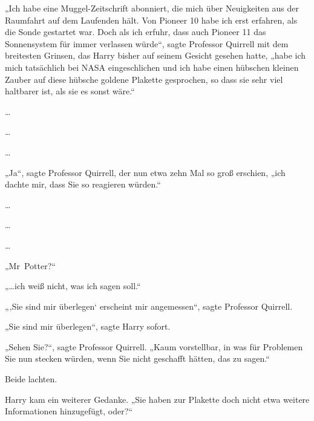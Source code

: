 „Ich habe eine Muggel-Zeitschrift abonniert, die mich über Neuigkeiten aus der Raumfahrt auf dem Laufenden hält. Von Pioneer 10 habe ich erst erfahren, als die Sonde gestartet war. Doch als ich erfuhr, dass auch Pioneer 11 das Sonnensystem für immer verlassen würde“, sagte Professor Quirrell mit dem breitesten Grinsen, das Harry bisher auf seinem Gesicht gesehen hatte, „habe ich mich tatsächlich bei NASA eingeschlichen und ich habe einen hübschen kleinen Zauber auf diese hübsche goldene Plakette gesprochen, so dass sie sehr viel haltbarer ist, als sie es sonst wäre.“

…

…

…

„Ja“, sagte Professor Quirrell, der nun etwa zehn Mal so groß erschien, „ich dachte mir, dass Sie so reagieren würden.“

…

…

…

„Mr~Potter?“

„…ich weiß nicht, was ich sagen soll.“

„‚Sie sind mir überlegen‘ erscheint mir angemessen“, sagte Professor Quirrell.

„Sie sind mir überlegen“, sagte Harry sofort.

„Sehen Sie?“, sagte Professor Quirrell. „Kaum vorstellbar, in was für Problemen Sie nun stecken würden, wenn Sie nicht geschafft hätten, das zu sagen.“

Beide lachten.

Harry kam ein weiterer Gedanke. „Sie haben zur Plakette doch nicht etwa weitere Informationen hinzugefügt, oder?“

